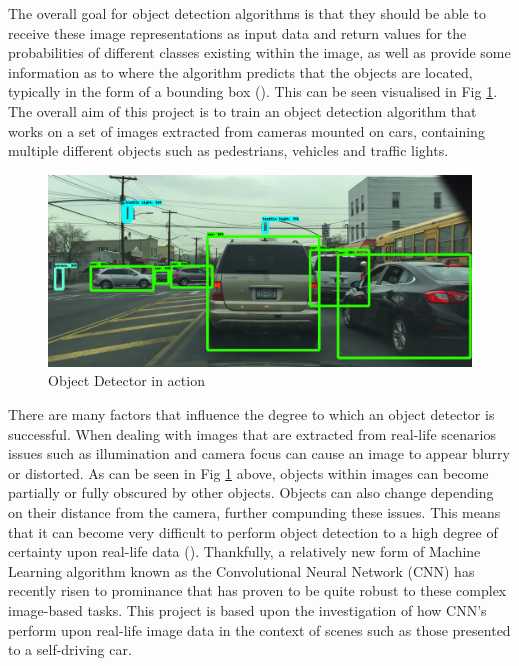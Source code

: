\documentclass[12pt]{report}
\begin{document}
\clearpage
\begin{flushleft}
The overall goal for object detection algorithms is that they should be able to receive these image representations as input data and return values for the probabilities of different classes existing within the image, as well as provide some information as to where the algorithm predicts that the objects are located, typically in the form of a bounding box (\cite{amit20022d}). This can be seen visualised in Fig \ref{fig:detection}. The overall aim of this project is to train an object detection algorithm that works on a set of images extracted from cameras mounted on cars, containing multiple different objects such as pedestrians, vehicles and traffic lights.
\end{flushleft}

\vspace{0.5cm}
\begin{figure}[ht!]
	\centering
	\includegraphics[width=14cm]{detection}
	\caption{Object Detector in action}
	\label{fig:detection}
\end{figure}

\begin{flushleft}
There are many factors that influence the degree to which an object detector is successful. When dealing with images that are extracted from real-life scenarios issues such as illumination and camera focus can cause an image to appear blurry or distorted. As can be seen in Fig \ref{fig:detection} above, objects within images can become partially or fully obscured by other objects. Objects can also change depending on their distance from the camera, further compunding these issues. This means that it can become very difficult to perform object detection to a high degree of certainty upon real-life data (\cite{zhao2019object}). Thankfully, a relatively new form of Machine Learning algorithm known as the Convolutional Neural Network (CNN) has recently risen to prominance that has proven to be quite robust to these complex image-based tasks. This project is based upon the investigation of how CNN's perform upon real-life image data in the context of scenes such as those presented to a self-driving car.
\end{flushleft}
\end{document}
